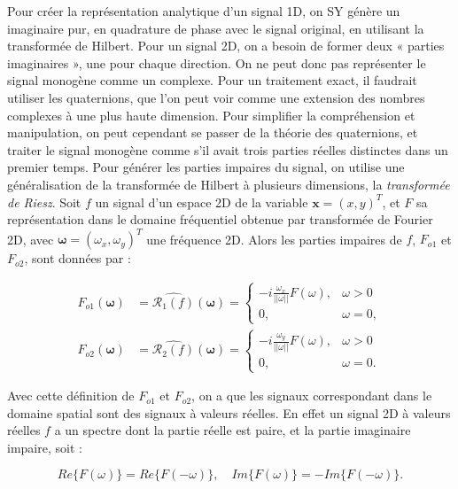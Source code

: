 Pour créer la représentation analytique d'un signal 1D, on SY génère un imaginaire pur, en quadrature de phase avec le signal original, en utilisant la transformée de Hilbert. Pour un signal 2D, on a besoin de former deux « parties imaginaires », une pour chaque direction. On ne peut donc pas représenter le signal monogène comme un complexe. Pour un traitement exact, il faudrait utiliser les quaternions, que l'on peut voir comme une extension des nombres complexes à une plus haute dimension. Pour simplifier la compréhension et manipulation, on peut cependant se passer de la théorie des quaternions, et traiter le signal monogène comme s'il avait trois parties réelles distinctes dans un premier temps.
Pour générer les parties impaires du signal, on utilise une généralisation de la transformée de Hilbert à plusieurs dimensions, la \textit{transformée de Riesz}. Soit $f$ un signal d'un espace 2D de la variable $\mathbf{x} = (x, y)^T$, et $F$ sa représentation dans le domaine fréquentiel obtenue par transformée de Fourier 2D, avec $\mathbf{\omega}=(\omega_x, \omega_y)^T$ une fréquence 2D. Alors les parties impaires de $f$, $F_{o1}$ et $F_{o2}$, sont données par :

\begin{align}
    F_{o1}(\mathbf{\omega}) &= \widehat{\mathcal{R}_1(f)}(\mathbf{\omega}) =
        \left\{
        \begin{array}{ll}
            -i\frac{\omega_x}{||\omega||}F(\omega), & \omega > 0 \\
            0, & \omega = 0,
        \end{array}
        \right. \\
    F_{o2}(\mathbf{\omega}) &= \widehat{\mathcal{R}_2(f)}(\mathbf{\omega}) =
        \left\{
        \begin{array}{ll}
            -i\frac{\omega_y}{||\omega||}F(\omega), & \omega > 0 \\
            0, & \omega = 0.
        \end{array}
        \right.
    \label{eq:2.20}
\end{align}

Avec cette définition de $F_{o1}$ et $F_{o2}$, on a que les signaux correspondant dans le domaine spatial sont des signaux à valeurs réelles. En effet un signal 2D à valeurs réelles $f$ a un spectre dont la partie réelle est paire, et la partie imaginaire impaire, soit :

\begin{equation}
    Re\{F(\omega)\} = Re\{F(-\omega)\}, \quad Im\{F(\omega)\} = -Im\{F(-\omega)\}.
\end{equation}

